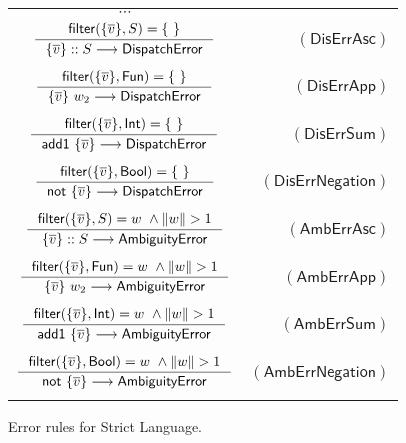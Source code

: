 \documentclass[preprint,authoryear,sort&compress,9pt,nocopyrightspace]{article}
\newcommand\rulename[1]{\mathsf{(#1)}}
\newcommand{\tto}{\longrightarrow}
\newcommand{\conf}[2][s]{(#2)[#1]}
\newcommand{\confextW}[1]{#1 [x \mapsto w \oplus s]}
\newcommand{\ascripS}[1]{#1::S}
\newcommand{\oletP}[3]{\mathsf{mlet} \ x = #2 \ \mathsf{in}  \ #3}
\newcommand{\absST}[2]{\lambda #1. \ #2}
\newcommand{\negacion}[1]{\mathsf{not} \ #1}
\newcommand{\suma}[1]{\mathsf{add1} \ #1}
\newcommand{\boolt}{\mathsf{Bool}}
\newcommand{\intt}{\mathsf{Int}}
\newcommand{\funt}{\mathsf{Fun}}
\newcommand{\filtrar}{\mathsf{filter}}
\newcommand{\buscar}{\mathsf{lookup}}
\newcommand{\dispatcherror}{\mathsf{DispatchError}}
\newcommand{\ambiguityerror}{\mathsf{AmbiguityError}}
\newcommand{\semanticC}{Strict Language}
\begin{document}
\begin{figure}[]
\begin{small}
\begin{center}
\begin{tabular}{|c r|}
\hline
$\cdots$&\\
$ \inference {\filtrar(\{\overline{v}\}, S) = \{\ \}} {\ascripS{\{\overline{v}\}} \tto \dispatcherror} $&$\rulename{DisErrAsc} $\\
&\\

$\inference{ \filtrar(\{\overline{v}\}, \funt) = \{ \ \}}{\{\overline{v}\} \ w_2 \tto \dispatcherror}$&$\rulename{DisErrApp}$\\
&\\
$\inference {\filtrar(\{\overline{v}\}, \intt)  = \{\ \} }{\suma{\{\overline{v}\}} \tto \dispatcherror}$&$\rulename{DisErrSum}$\\
&\\
$\inference {\filtrar(\{\overline{v}\}, \boolt)  = \{ \ \} }{\negacion{\{\overline{v}\}}\tto \dispatcherror}$&$\rulename{DisErrNegation}$\\
&\\

$ \inference {\filtrar(\{\overline{v}\}, S) = w \ \wedge \|w\| > 1} {\ascripS{\{\overline{v}\}} \tto \ambiguityerror} $&$\rulename{AmbErrAsc} $\\
&\\

$\inference{ \filtrar(\{\overline{v}\}, \funt) = w \ \wedge \|w\| > 1}{\{\overline{v}\} \ w_2 \tto \ambiguityerror}$&$\rulename{AmbErrApp}$\\
&\\
$\inference {\filtrar(\{\overline{v}\}, \intt)  = w \ \wedge \|w\| > 1}{\suma{\{\overline{v}\}} \tto \ambiguityerror}$&$\rulename{AmbErrSum}$\\
&\\
$\inference {\filtrar(\{\overline{v}\}, \boolt)  = w \ \wedge \|w\| > 1}{\negacion{\{\overline{v}\}}\tto \ambiguityerror}$&$\rulename{AmbErrNegation}$\\
&\\
\hline
\end{tabular}
\caption{Error rules for \semanticC.}
\label{tabla:errorRulesStrictMore}
\end{center}
\end{small}
\end{figure}
\end{document}
